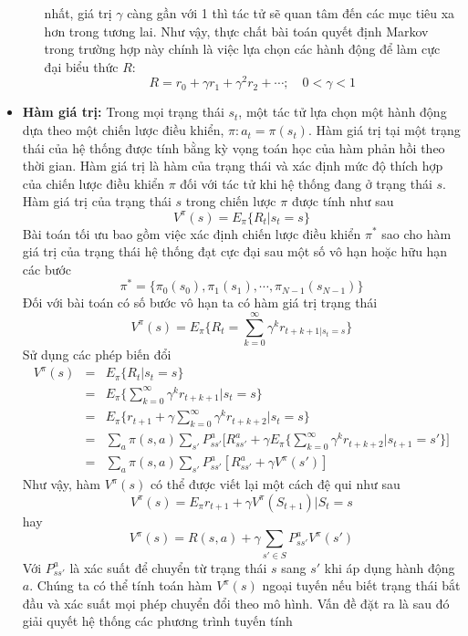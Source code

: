\documentclass[12pt,a4paper]{report}
\begin{document}
\begin{itemize}
\begin{itemize}
		nhất, giá trị $\gamma$ càng gần với 1 thì tác tử sẽ quan tâm đến các mục tiêu xa hơn trong tương
		lai. Như vậy, thực chất bài toán quyết định Markov trong trường hợp này chính là việc
		lựa chọn các hành động để làm cực đại biểu thức $R$: $$R = r_0 + \gamma r_1 + \gamma^2r_2 + \cdots; \quad 0 < \gamma < 1$$
	\end{itemize}
\item \textbf{Hàm giá trị:} Trong mọi trạng thái $s_t$, một tác tử lựa chọn một hành động dựa theo một chiến lược điều
khiển, $\pi: a_t = \pi(s_t)$. Hàm giá trị tại một trạng thái của hệ thống được tính bằng kỳ vọng toán
học của hàm phản hồi theo thời gian. Hàm giá trị là hàm của trạng thái và xác định mức độ
thích hợp của chiến lược điều khiển $\pi$ đối với tác tử khi hệ thống đang ở trạng thái $s$. Hàm
giá trị của trạng thái $s$ trong chiến lược $\pi$ được tính như sau $$V^{\pi}(s) = E_{\pi}\{R_t|s_t=s\}$$ Bài toán tối ưu bao gồm việc xác định chiến lược điều khiển $\pi^*$ sao cho hàm giá trị của trạng
thái hệ thống đạt cực đại sau một số vô hạn hoặc hữu hạn các bước $$\pi^* = \{\pi_0(s_0), \pi_1(s_1), \cdots,\pi_{N-1}(s_{N-1})\}$$
Đối với bài toán có số bước vô hạn ta có hàm giá trị trạng thái $$V^{\pi}(s) = E_{\pi}\{R_t = \sum_{k=0}^{\infty}\gamma^kr_{t+k+1|s_t = s}\}$$ Sử dụng các phép biến đổi
\begin{eqnarray}
	V^\pi(s) & = & E_{\pi}\{R_t|s_t=s\}\nonumber \\ &=& E_{\pi} \bigg\{\sum_{k=0}^{\infty}\gamma^kr_{t+k+1}|s_t = s\bigg\}\nonumber \\ &=& E_{\pi}\bigg\{r_{t+1}+\gamma\sum_{k=0}^{\infty}\gamma^kr_{t+k+2}|s_t=s\bigg\} \nonumber\\&=& \sum_{a}\pi(s, a)\sum_{s'}P^a_{ss'}\bigg[R^a_{ss'} + \gamma E_{\pi}\bigg\{\sum_{k=0}^{\infty}\gamma^kr_{t+k+2}|s_{t+1} = s'\bigg\}\bigg] \nonumber \\ &=& \sum_{a}\pi(s, a) \sum_{s'}P^a_{ss'}[R^a_{ss'} + \gamma V^{\pi}(s')] \nonumber
\end{eqnarray} Như vậy, hàm $V^{\pi}(s)$ có thể được viết lại một cách đệ qui như sau $$V^{\pi}(s) = E_{\pi}r_{t+1} + \gamma V^{\pi}(S_{t+1})|S_t = s$$ hay \begin{equation}
	V^{\pi}(s) = R(s, a) + \gamma\sum_{s'\in S}P^a_{ss'}V^{\pi}(s')
\end{equation}
Với $P^a_{ss'}$ là xác suất để chuyển từ trạng thái $s$ sang $s'$ khi áp dụng hành động $a$. Chúng ta có
thể tính toán hàm $V^{\pi}(s)$ ngoại tuyến nếu biết trạng thái bắt đầu và xác suất mọi phép chuyển
đổi theo mô hình. Vấn đề đặt ra là sau đó giải quyết hệ thống các phương trình tuyến tính

\end{itemize}
\end{document}
